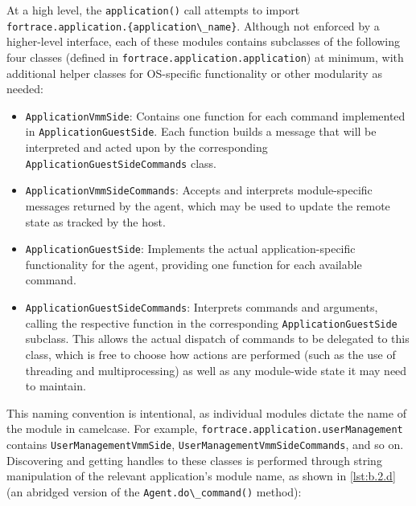At a high level, the \passthrough{\lstinline!application()!} call
attempts to import
\passthrough{\lstinline!fortrace.application.\{application\_name\}!}.
Although not enforced by a higher-level interface, each of these modules
contains subclasses of the following four classes (defined in
\passthrough{\lstinline!fortrace.application.application!}) at minimum,
with additional helper classes for OS-specific functionality or other
modularity as needed:

\begin{itemize}
\tightlist
\item
  \passthrough{\lstinline!ApplicationVmmSide!}: Contains one function
  for each command implemented in
  \passthrough{\lstinline!ApplicationGuestSide!}. Each function builds a
  message that will be interpreted and acted upon by the corresponding
  \passthrough{\lstinline!ApplicationGuestSideCommands!} class.
\item
  \passthrough{\lstinline!ApplicationVmmSideCommands!}: Accepts and
  interprets module-specific messages returned by the agent, which may
  be used to update the remote state as tracked by the host.
\item
  \passthrough{\lstinline!ApplicationGuestSide!}: Implements the actual
  application-specific functionality for the agent, providing one
  function for each available command.
\item
  \passthrough{\lstinline!ApplicationGuestSideCommands!}: Interprets
  commands and arguments, calling the respective function in the
  corresponding \passthrough{\lstinline!ApplicationGuestSide!} subclass.
  This allows the actual dispatch of commands to be delegated to this
  class, which is free to choose how actions are performed (such as the
  use of threading and multiprocessing) as well as any module-wide state
  it may need to maintain.
\end{itemize}

This naming convention is intentional, as individual modules dictate the
name of the module in camelcase. For example,
\passthrough{\lstinline!fortrace.application.userManagement!} contains
\passthrough{\lstinline!UserManagementVmmSide!},
\passthrough{\lstinline!UserManagementVmmSideCommands!}, and so on.
Discovering and getting handles to these classes is performed through
string manipulation of the relevant application's module name, as shown
in \autoref{lst:b.2.d} (an abridged version of the
\passthrough{\lstinline!Agent.do\_command()!} method):

